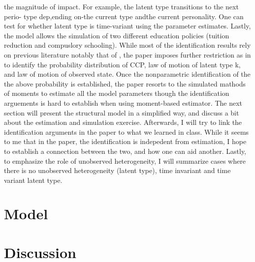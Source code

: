 \documentclass[10pt]{article}
\begin{document}
the magnitude of impact. For example, the latent type transitions to the next perio- type dep,ending on-the current type andthe current personality. One can test for whether latent type is time-variant using the parameter estimates. Lastly, the model allows the simulation of two different education policies (tuition reduction and compuslory schooling). While most of the identification results rely on previous literature notably that of \cite{hu2012nonparametric}, the paper imposes further restriction as in \citet{hu2017simple} to identify the probability distribution of CCP, law of motion of latent type k, and law of motion of observed state. Once the nonparametric identification of the the above probability is established, the paper resorts to the simulated mathods of moments to estimate all the model parameters though the identification arguements is hard to establish when using moment-based estimator. The next section will present the structural model in a simplified way, and discuss a bit about the estimation and simulation exercise. Afterwards, I will try to link the identification arguments in the paper to what we learned in class. While it seems to me that in the paper, the identification is indepedent from estimation, I hope to establish a connection between the two, and how one can aid another. Lastly, to emphasize the role of unobserved heterogeneity, I will summarize cases where there is no unobserved heterogeneity (latent type), time invariant and time variant latent type.
\section{Model}

\section{Discussion}

\pagebreak \newpage 
\end{document}
